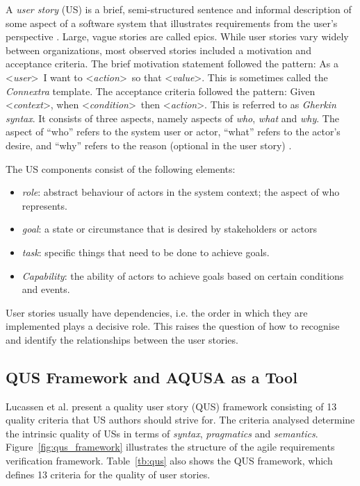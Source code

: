A \emph{user story} (US) is a brief, semi-structured sentence and informal description of some aspect of a software system that illustrates requirements from the user’s perspective \cite{raharjana2021user}. Large, vague stories are called epics. While user stories vary widely between organizations, most observed stories included a motivation and acceptance criteria. The brief motivation statement followed the pattern:  As a  \textless\emph{user}\textgreater\ I want to \textless\emph{action}\textgreater\ so that \textless\emph{value}\textgreater. This is sometimes called the \emph{Connextra} template. The acceptance criteria followed the pattern: Given \textless\emph{context}\textgreater, when \textless\emph{condition}\textgreater \  then \textless\emph{action}\textgreater. This is referred to as \emph{Gherkin syntax}\cite{wynne2017cucumber}. It consists of three aspects, namely aspects of \emph{who}, \emph{what} and \emph{why}. The aspect of \enquote{who} refers to the system user or actor, \enquote{what} refers to the actor’s desire, and \enquote{why} refers to the reason (optional in the user story) \cite{raharjana2021user}.

The US components consist of the following elements\cite{wautelet2017user}: 
\begin{itemize}
\item\emph{role}: abstract behaviour of actors in the system context; the aspect of who represents.
\item\emph{goal}: a state or circumstance that is desired by stakeholders or actors
\item\emph{task}: specific things that need to be done to achieve goals.
\item\emph{Capability}: the ability of actors to achieve goals based on certain conditions and events.
\end{itemize}

User stories usually have dependencies, i.e. the order in which they are implemented plays a decisive role. This raises the question of how to recognise and identify the relationships between the user stories.

\subsection{QUS Framework and AQUSA as a Tool}\label{quality-framework}
Lucassen et al. \cite{lucassen2016improving} present a quality user story (QUS) framework consisting of 13 quality criteria that US authors should strive for. The criteria analysed determine the intrinsic quality of USs in terms of \emph{syntax}, \emph{pragmatics} and \emph{semantics}. Figure~\ref{fig:qus_framework} illustrates the structure of the agile requirements verification framework. Table~\ref{tb:qus} also shows the QUS framework, which defines 13 criteria for the quality of user stories.

